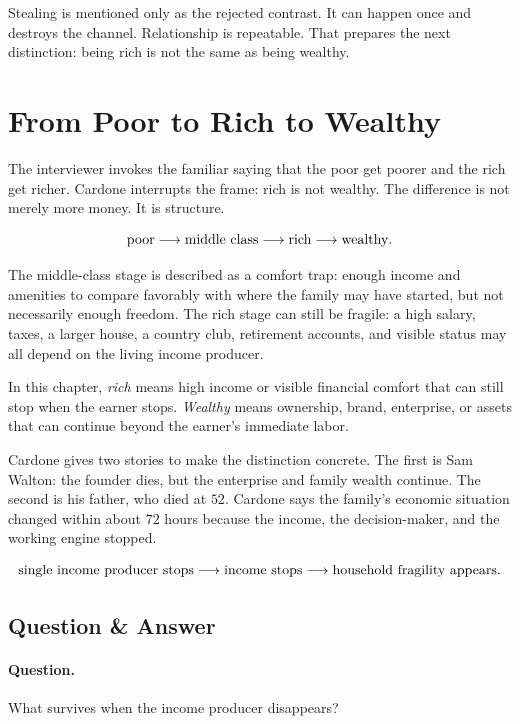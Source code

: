 Stealing is mentioned only as the rejected contrast. It can happen once and destroys the channel. Relationship is repeatable. That prepares the next distinction: being rich is not the same as being wealthy.

\section{From Poor to Rich to Wealthy}

The interviewer invokes the familiar saying that the poor get poorer and the rich get richer. Cardone interrupts the frame: rich is not wealthy. The difference is not merely more money. It is structure.

\begin{equation}
\hbox{poor}
\longrightarrow
\hbox{middle class}
\longrightarrow
\hbox{rich}
\longrightarrow
\hbox{wealthy}.
\end{equation}

The middle-class stage is described as a comfort trap: enough income and amenities to compare favorably with where the family may have started, but not necessarily enough freedom. The rich stage can still be fragile: a high salary, taxes, a larger house, a country club, retirement accounts, and visible status may all depend on the living income producer.

\begin{definition}
In this chapter, \emph{rich} means high income or visible financial comfort that can still stop when the earner stops. \emph{Wealthy} means ownership, brand, enterprise, or assets that can continue beyond the earner's immediate labor.
\end{definition}

Cardone gives two stories to make the distinction concrete. The first is Sam Walton: the founder dies, but the enterprise and family wealth continue. The second is his father, who died at \(52\). Cardone says the family's economic situation changed within about \(72\) hours because the income, the decision-maker, and the working engine stopped.

\[
\hbox{single income producer stops}
\longrightarrow
\hbox{income stops}
\longrightarrow
\hbox{household fragility appears}.
\]

\subsection{Question \& Answer}

\paragraph{Question.} What survives when the income producer disappears?


